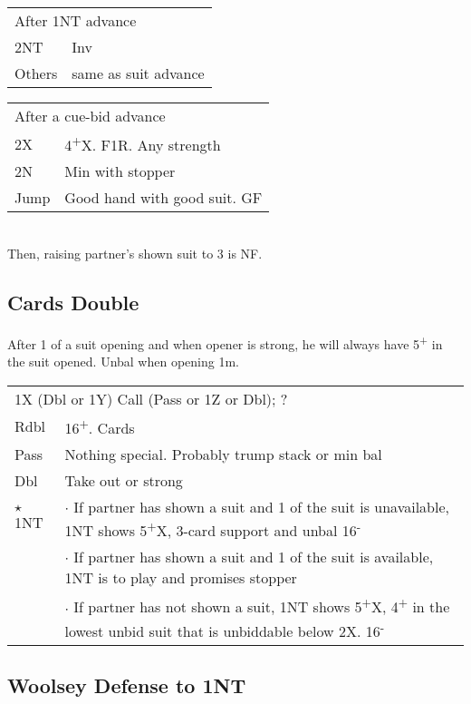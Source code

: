\documentclass{article}
\newcommand{\nt}{\relsize{-1}NT\relsize{1}}
\newcommand{\up}{\textsuperscript{+}}
\newcommand{\down}{\textsuperscript{-}}
\newcommand{\al}{$\star$ }
\begin{document}
\medskip

\begin{tabular}{|l|p{6.5cm}}
	\multicolumn{2}{l}{After 1\nt{} advance} \\
  2\nt{} & Inv \\
	Others & same as suit advance \\
\end{tabular}

\medskip

\begin{tabular}{|l|p{6.5cm}}
	\multicolumn{2}{l}{After a cue-bid advance} \\
  2X & 4\up{}X. F1R. Any strength \\
	2N & Min with stopper \\
	Jump & Good hand with good suit. GF \\
\end{tabular}\\
Then, raising partner's shown suit to 3 is NF.

\subsection{Cards Double}
After 1 of a suit opening and when opener is strong, he will always have 5\up{} in the suit opened. Unbal when opening 1m. \\

\begin{tabular}{|l|p{6.5cm}}
	\multicolumn{2}{l}{1X (Dbl or 1Y) Call (Pass or 1Z or Dbl); ?} \\
	Rdbl & 16\up{}. Cards \\
	Pass & Nothing special. Probably trump stack or min bal \\
	Dbl & Take out or strong \\
	\al{}1\nt{} &  $\cdot$ If partner has shown a suit and 1 of the suit is unavailable, 1\nt{} shows 5\up{}X, 3-card support and unbal 16\down{} \\
	 &  $\cdot$ If partner has shown a suit and 1 of the suit is available, 1\nt{} is to play and promises stopper \\
	 &  $\cdot$ If partner has not shown a suit, 1\nt{} shows 5\up{}X, 4\up{} in the lowest unbid suit that is unbiddable below 2X. 16\down{} \\
\end{tabular}

\subsection{Woolsey Defense to 1\nt{}}
\end{document}
